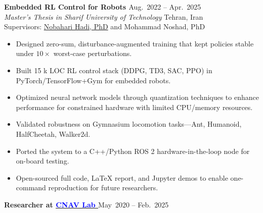 \documentclass[12pt]{article}
\begin{document}
\vspace{-4pt}
\noindent %
{\bfseries  Embedded RL Control for Robots
\href{https://github.com/CNAVLAB}{\faGithub}
} \hfill Aug.\ 2022 -- Apr.\ 2025 \\[2pt]
\noindent \textit{Master's Thesis in Sharif University of Technology} \hfill Tehran, Iran \\[2pt]
\noindent Supervisors:
\href{https://ae.sharif.edu/~portal/faculty/1091235256}{Nobahari Hadi, PhD} 
{
	and
Mohammad Noshad, PhD
 }{}
\vspace{-4pt}
\begin{itemize}   \itemsep 1pt %
	\item Designed zero-sum, disturbance-augmented training that kept policies stable under $10\times\!$ worst-case perturbations.
	\item Built 15 k LOC RL control stack (DDPG, TD3, SAC, PPO) in PyTorch/TensorFlow+Gym for embedded robots.
	\item Optimized neural network models through quantization techniques to enhance performance for constrained hardware with limited CPU/memory resources.
    \item Validated robustness on Gymnasium locomotion tasks—Ant, Humanoid, HalfCheetah, Walker2d.%
    \item Ported the system to a C++/Python ROS 2 hardware-in-the-loop node for on-board testing.%
    \item Open-sourced full code, LaTeX report, and Jupyter demos to enable one-command reproduction for future researchers.
\end{itemize}
\noindent
{\bfseries Researcher at
\href{https://www.linkedin.com/company/cnav-lab/}{\textcolor{blue}{CNAV Lab \faLinkedin}} \href{https://github.com/CNAVLAB}{\faGithub}
\textcolor{red}{
\href{https://youtube.com/@cnavlab?si=Fc-Y3oyKdgAmz3-5}{\faYoutube}}
} \hfill May\ 2020 -- Feb.\ 2025 \\[2pt]
\end{document}
